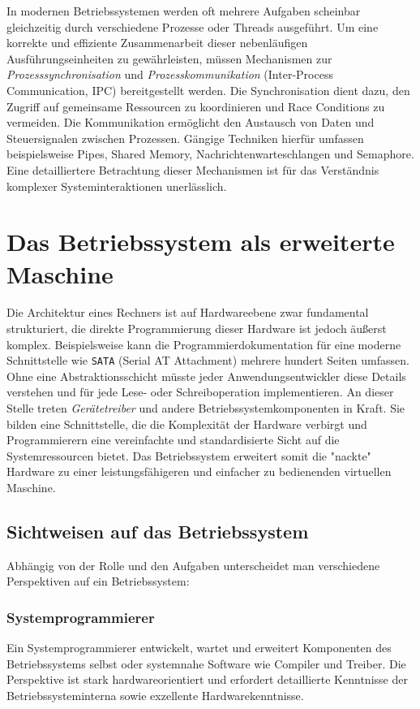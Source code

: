 In modernen Betriebssystemen werden oft mehrere Aufgaben scheinbar gleichzeitig durch verschiedene Prozesse oder Threads ausgeführt. Um eine korrekte und effiziente Zusammenarbeit dieser nebenläufigen Ausführungseinheiten zu gewährleisten, müssen Mechanismen zur \textit{Prozesssynchronisation} und \textit{Prozesskommunikation} (Inter-Process Communication, IPC) bereitgestellt werden. Die Synchronisation dient dazu, den Zugriff auf gemeinsame Ressourcen zu koordinieren und Race Conditions zu vermeiden. Die Kommunikation ermöglicht den Austausch von Daten und Steuersignalen zwischen Prozessen. Gängige Techniken hierfür umfassen beispielsweise Pipes, Shared Memory, Nachrichtenwarteschlangen und Semaphore. Eine detailliertere Betrachtung dieser Mechanismen ist für das Verständnis komplexer Systeminteraktionen unerlässlich.

\section{Das Betriebssystem als erweiterte Maschine}

Die Architektur eines Rechners ist auf Hardwareebene zwar fundamental strukturiert, die direkte Programmierung dieser Hardware ist jedoch äußerst komplex. Beispielsweise kann die Programmierdokumentation für eine moderne Schnittstelle wie \texttt{SATA} (Serial AT Attachment) mehrere hundert Seiten umfassen. Ohne eine Abstraktionsschicht müsste jeder Anwendungsentwickler diese Details verstehen und für jede Lese- oder Schreiboperation implementieren. An dieser Stelle treten \textit{Gerätetreiber} und andere Betriebssystemkomponenten in Kraft. Sie bilden eine Schnittstelle, die die Komplexität der Hardware verbirgt und Programmierern eine vereinfachte und standardisierte Sicht auf die Systemressourcen bietet. Das Betriebssystem erweitert somit die "nackte" Hardware zu einer leistungsfähigeren und einfacher zu bedienenden virtuellen Maschine.

\subsection{Sichtweisen auf das Betriebssystem}

Abhängig von der Rolle und den Aufgaben unterscheidet man verschiedene Perspektiven auf ein Betriebssystem:

\subsubsection{Systemprogrammierer}
Ein Systemprogrammierer entwickelt, wartet und erweitert Komponenten des Betriebssystems selbst oder systemnahe Software wie Compiler und Treiber. Die Perspektive ist stark hardwareorientiert und erfordert detaillierte Kenntnisse der Betriebssysteminterna sowie exzellente Hardwarekenntnisse.

